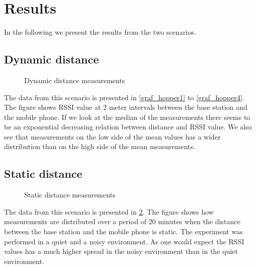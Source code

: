 \section{Results}
\label{sec_results}

In the following we present the results from the two scenarios.

\subsection{Dynamic distance}

\begin{figure}		
	
	
	
	\caption{ Dynamic distance measurements }
	\label{graf_DynamicMesurements}
	
\end{figure}

%	
%	
%	
%	

The data from this scenario is presented in \cref{graf_hopper1} to \cref{graf_hopper4}.
The figure shows RSSI value at 2 meter intervals between the base station and the mobile phone.
If we look at the median of the measurements there seems to be an exponential decreasing relation between distance and RSSI value.
We also see that measurements on the low side of the mean values has a wider distribution than on the high side of the mean measurements.

\subsection{Static distance}
\begin{figure}
	
	
	\caption{Static distance measurements}
	\label{graf_StaticMesurements}
\end{figure}

The data from this scenario is presented in \cref{graf_StaticMesurements}.
The figure shows how measurements are distributed over a period of 20 minutes when the distance between the base station and the mobile phone is static.
The experiment was performed in a quiet and a noisy environment.
As one would expect the RSSI values has a much higher spread in the noisy environment than in the quiet environment. 
 

